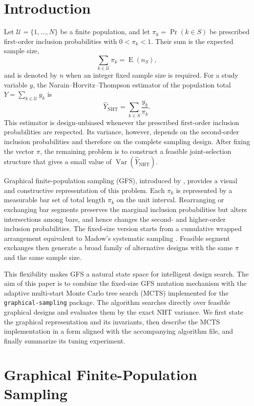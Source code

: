 \documentclass[twoside]{article}
\newcommand{\U}{\mathcal{U}}
\newcommand{\Sample}{S}
\newcommand{\NHT}{\mathrm{NHT}}
\newcommand{\Var}{\operatorname{Var}}
\newcommand{\pr}{\operatorname{Pr}}
\newcommand{\E}{\operatorname{E}}
\begin{document}
\section{Introduction}

Let $\U=\{1,\ldots,N\}$ be a finite population, and let
$\pi_k=\pr(k\in \Sample)$ be prescribed first-order inclusion probabilities
with $0<\pi_k<1$. Their sum is the expected sample size,
\[
    \sum_{k\in\U}\pi_k=\E(n_{\Sample}),
\]
and is denoted by $n$ when an integer fixed sample size is required. For a
study variable $y$, the Narain--Horvitz--Thompson estimator of the population
total $Y=\sum_{k\in\U}y_k$ is
\[
    \widehat Y_{\NHT}=\sum_{k\in \Sample}\frac{y_k}{\pi_k}.
\]
This estimator is design-unbiased whenever the prescribed first-order
inclusion probabilities are respected. Its variance, however, depends on the
second-order inclusion probabilities and therefore on the complete sampling
design. After fixing the vector $\pi$, the remaining problem is to construct a
feasible joint-selection structure that gives a small value of
$\Var(\widehat Y_{\NHT})$.

Graphical finite-population sampling (GFS), introduced by
\cite{Panahbehagh2026}, provides a visual and constructive representation of
this problem. Each $\pi_k$ is represented by a measurable bar set of total
length $\pi_k$ on the unit interval. Rearranging or exchanging bar segments
preserves the marginal inclusion probabilities but alters intersections among
bars, and hence changes the second- and higher-order inclusion probabilities.
The fixed-size version starts from a cumulative wrapped arrangement equivalent
to Madow's systematic sampling \cite{Madow1949}. Feasible segment exchanges
then generate a broad family of alternative designs with the same $\pi$ and
the same sample size.

This flexibility makes GFS a natural state space for intelligent design search.
The aim of this paper is to combine the fixed-size GFS mutation mechanism with
the adaptive multi-start Monte Carlo tree search (MCTS) implemented for the
{\tt graphical-sampling} package. The algorithm searches directly over feasible
graphical designs and evaluates them by the exact NHT variance. We first state
the graphical representation and its invariants, then describe the MCTS
implementation in a form aligned with the accompanying algorithm file, and
finally summarize its tuning experiment.

\section{Graphical Finite-Population Sampling}
\end{document}
